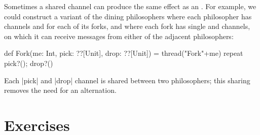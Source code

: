 Sometimes a shared channel can produce the same effect as an .  For
example, we could construct a variant of the dining philosophers where each
philosopher has channels  and  for each of its forks,
and where each fork has single  and  channels, on
which it can receive messages from either of the adjacent philosophers:
%
\begin{scala}
  def Fork(me: Int, pick: ??[Unit], drop: ??[Unit]) = thread("Fork"+me){
    repeat{ pick?(); drop?() }
  }
\end{scala}
%
Each |pick| and |drop| channel is shared between two philosophers; this
sharing removes the need for an alternation.
%


\section*{Exercises}
 



